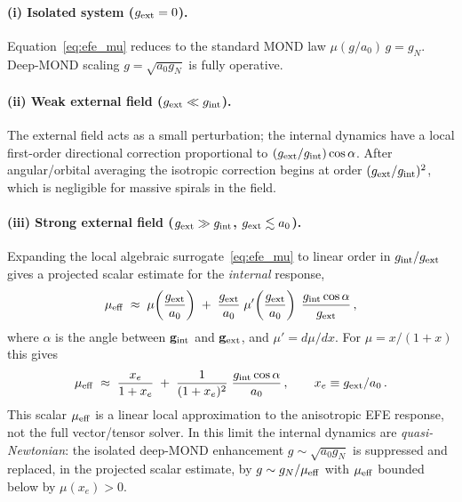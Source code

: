 \documentclass[11pt]{article}
\begin{document}
\paragraph{(i) Isolated system ($g_{\rm ext} = 0$).}
Equation~\eqref{eq:efe_mu} reduces to the standard MOND law
$\mu(g/a_0)\,g = g_N$.  Deep-MOND scaling
$g = \sqrt{a_0 g_N}$ is fully operative.

\paragraph{(ii) Weak external field ($g_{\rm ext} \ll g_{\rm int}$).}
The external field acts as a small perturbation; the internal
dynamics have a local first-order directional correction
proportional to $(g_{\rm ext}/g_{\rm int})\cos\alpha$.  After
angular/orbital averaging the isotropic correction begins at
order $(g_{\rm ext}/g_{\rm int})^2$, which is negligible for massive
spirals in the field.

\paragraph{(iii) Strong external field ($g_{\rm ext} \gg g_{\rm int}$,
$g_{\rm ext} \lesssim a_0$).}
Expanding the local algebraic surrogate~\eqref{eq:efe_mu} to linear
order in $g_{\rm int}/g_{\rm ext}$ gives a projected scalar estimate
for the \emph{internal} response,
\begin{equation}
  \mu_{\rm eff}
  \;\approx\;
  \mu\!\left(\frac{g_{\rm ext}}{a_0}\right)
  \;+\;
  \frac{g_{\rm ext}}{a_0}\;\mu'\!\left(\frac{g_{\rm ext}}{a_0}\right)
  \;\frac{g_{\rm int}\cos\alpha}{g_{\rm ext}}\,,
\label{eq:mu_eff_efe}
\end{equation}
where $\alpha$ is the angle between $\mathbf{g}_{\rm int}$ and
$\mathbf{g}_{\rm ext}$, and $\mu' = d\mu/dx$.  For
$\mu = x/(1+x)$ this gives
\begin{equation}
  \mu_{\rm eff}
  \;\approx\;
  \frac{x_e}{1+x_e}
  \;+\;
  \frac{1}{(1+x_e)^2}\;\frac{g_{\rm int}\cos\alpha}{a_0}\,,
  \qquad
  x_e \equiv g_{\rm ext}/a_0\,.
\label{eq:mu_eff_simple}
\end{equation}
This scalar $\mu_{\rm eff}$ is a linear local approximation to the
anisotropic EFE response, not the full vector/tensor solver.  In this
limit the internal dynamics are \emph{quasi-Newtonian}: the isolated
deep-MOND enhancement $g \sim \sqrt{a_0 g_N}$ is suppressed and
replaced, in the projected scalar estimate, by
$g \sim g_N/\mu_{\rm eff}$ with $\mu_{\rm eff}$ bounded below by
$\mu(x_e)>0$.
\end{document}
